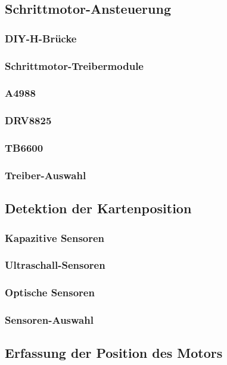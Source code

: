 \subsection{Schrittmotor-Ansteuerung}
\subsubsection{DIY-H-Brücke}
\subsubsection{Schrittmotor-Treibermodule}
\subsubsection{A4988}
\subsubsection{DRV8825}
\subsubsection{TB6600}
\subsubsection{Treiber-Auswahl}


\subsection{Detektion der Kartenposition}
\subsubsection{Kapazitive Sensoren}
\subsubsection{Ultraschall-Sensoren}
\subsubsection{Optische Sensoren}
\subsubsection{Sensoren-Auswahl}

\subsection{Erfassung der Position des Motors}
